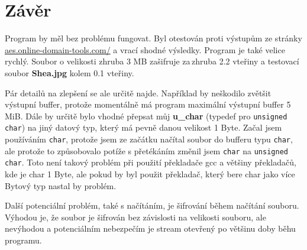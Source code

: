 \documentclass[12pt]{article}
\begin{document}
\section{Závěr}
Program by měl bez problému fungovat. Byl otestován proti výstupům
ze stránky \url{aes.online-domain-tools.com/} a vrací shodné výsledky. Program 
je také velice rychlý. Soubor o velikosti zhruba 3 MB zašifruje za\,zhruba
2.2 vteřiny a testovací soubor \textbf{Shea.jpg} kolem 0.1 vteřiny.

Pár detailů na zlepšení se ale určitě najde. Například by neškodilo zvětšit
výstupní buffer, protože momentálně má program maximální výstupní buffer 5 MiB.
Dále by určitě bylo vhodné přepsat můj \textbf{u\_char} (typedef pro
\texttt{unsigned char}) na jiný datový typ,
který má pevně danou velikost 1 Byte. Začal jsem používáním \texttt{char}, 
protože jsem ze začátku načítal soubor do bufferu typu \texttt{char}, ale
protože to způsobovalo potíže s přetékáním změnil jsem \texttt{char} na
\texttt{unsigned char}. Toto není takový problém při použití překladače gcc
a většiny překladačů, kde je char 1 Byte, ale pokud by byl použit překladač,
který bere char jako více Bytový typ nastal by problém.

Další potenciální problém, také s načítáním, je šifrování během načítání
souboru. Výhodou je, že soubor je šifrován bez závislosti na velikosti
souboru, ale nevýhodou a potenciálním nebezpečím je stream otevřený
po většinu doby běhu programu.
%
\end{document}
